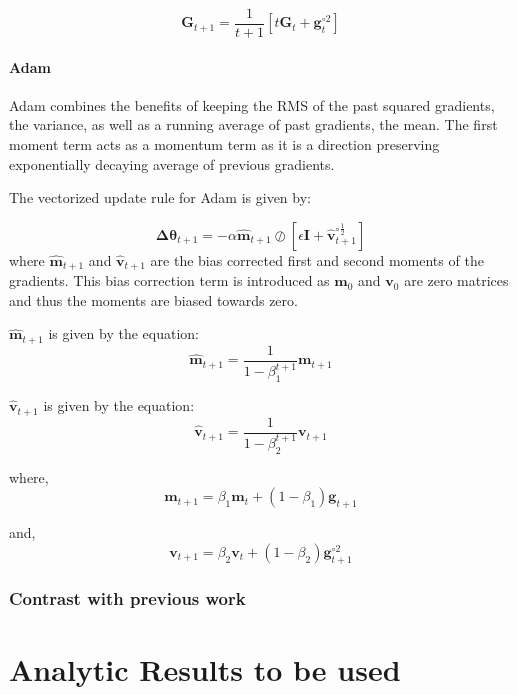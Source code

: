 \documentclass{article}
\begin{document}
\begin{equation}
\boldsymbol{G}_{t+1} = \frac{1}{t+1}[t\boldsymbol{G}_{t} + \boldsymbol{g}_{t}^{\circ{2}}]
\end{equation}
\paragraph{Adam}
Adam combines the benefits of keeping the RMS of the past squared gradients, the variance, as well as a running average of past gradients, the mean. The first moment term acts as a momentum term as it is a direction preserving exponentially decaying average of previous gradients.

The vectorized update rule for Adam is given by:

\begin{equation}
\boldsymbol{\Delta{\theta}}_{t+1} = -\alpha\boldsymbol{\hat{m}}_{t+1}\oslash{[\epsilon\boldsymbol{I} +\boldsymbol{\hat{v}}_{t+1}^{\circ\frac{1}{2}}]}
\end{equation}
where $\boldsymbol{\hat{m}}_{t+1}$ and $\boldsymbol{\hat{v}}_{t+1}$ are the bias corrected first and second moments of the gradients. This bias correction term is introduced as $\boldsymbol{m}_0$ and $\boldsymbol{v}_0$ are zero matrices and thus the moments are biased towards zero.

$\boldsymbol{\hat{m}}_{t+1}$ is given by the equation:
\begin{equation}
\boldsymbol{\hat{m}}_{t+1} = \frac{1}{1-\beta_1^{t+1}}\boldsymbol{m}_{t+1}
\end{equation}

$\boldsymbol{\hat{v}}_{t+1}$ is given by the equation:
\begin{equation}
\boldsymbol{\hat{v}}_{t+1} = \frac{1}{1-\beta_2^{t+1}}\boldsymbol{v}_{t+1}
\end{equation}

where,
\begin{equation}
\boldsymbol{m}_{t+1} = \beta_1\boldsymbol{m}_{t} + (1-\beta_1)\boldsymbol{g}_{t+1}
\end{equation}

and,
\begin{equation}
\boldsymbol{v}_{t+1} = \beta_2\boldsymbol{v}_{t} + (1-\beta_2)\boldsymbol{g}_{t+1}^{\circ2}
\end{equation}
\subsubsection{Contrast with previous work}
\section{Analytic Results to be used}	
	
\end{document}

